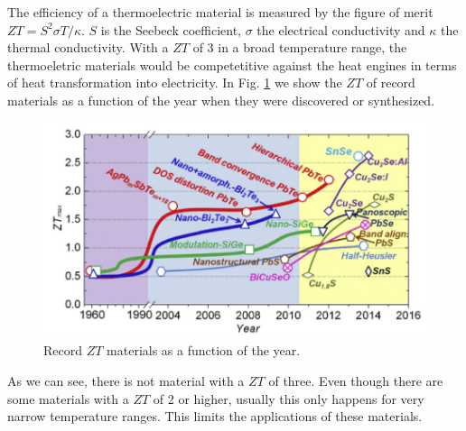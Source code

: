 The efficiency of a thermoelectric material is measured by the figure of merit $ZT=S^{2}\sigma T/\kappa$. $S$ is the
Seebeck coefficient, $\sigma$ the electrical conductivity and $\kappa$ the thermal conductivity. With a $ZT$ of 3 
in a broad temperature range, the thermoeletric materials would be competetitive against the heat engines in terms of
heat transformation into electricity. In Fig. \ref{ztvst} we show the $ZT$ of record materials as a function of the 
year when they were discovered or synthesized.
\begin{figure}[h]
\begin{center}
\includegraphics[width=0.9\linewidth]{Figures/ztvstemp.png}
\caption[Record $ZT$ materials]{Record $ZT$ materials as a function of the year.}
\label{ztvst}
\end{center}
\end{figure}
As we can see, there is not material with a $ZT$ of three. Even though there are some materials with a $ZT$ of 2 or 
higher, usually this only happens for very narrow temperature ranges. This limits the applications of these 
materials. \\

